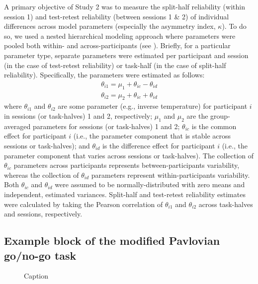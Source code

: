 \documentclass[a4paper,12pt]{article}
\begin{document}
\begin{refsection}[supp]
A primary objective of Study 2 was to measure the split-half reliability (within session 1) and test-retest reliability (between sessions 1 \& 2) of individual differences across model parameters (especially the asymmetry index, $\kappa$). To do so, we used a nested hierarchical modeling approach where parameters were pooled both within- and across-participants (see \cite{rouder2019psychometrics}). Briefly, for a particular parameter type, separate parameters were estimated per participant and session (in the case of test-retest reliability) or task-half (in the case of split-half reliability). Specifically, the parameters were estimated as follows:
\begin{equation}
\begin{split}
    \theta_{i1} = \mu_1 + \theta_{ic} - \theta_{id} \\
    \theta_{i2} = \mu_2 + \theta_{ic} + \theta_{id}
\end{split}
\end{equation}
where $\theta_{i1}$ and $\theta_{i2}$ are some parameter (e.g., inverse temperature) for participant $i$ in sessions (or task-halves) 1 and 2, respectively; $\mu_1$ and $\mu_2$ are the group-averaged parameters for sessions (or task-halves) 1 and 2; $\theta_{ic}$ is the common effect for participant $i$ (i.e., the parameter component that is stable across sessions or task-halves); and $\theta_{id}$ is the difference effect for participant $i$ (i.e., the parameter component that varies across sessions or task-halves). The collection of $\theta_{ic}$ parameters across participants represents between-participants variability, whereas the collection of $\theta_{id}$ parameters represent within-participants variability. Both $\theta_{ic}$ and $\theta_{id}$ were assumed to be normally-distributed with zero means and independent, estimated variances. Split-half and test-retest reliability estimates were calculated by taking the Pearson correlation of $\theta_{i1}$ and $\theta_{i2}$ across task-halves and sessions, respectively.

\break
\subsection*{Example block of the modified Pavlovian go/no-go task}

\begin{figure}[h]
    \centerline{}
    \caption{Caption}
    \label{fig:figS01}
\end{figure}


\end{refsection}
\end{document}
